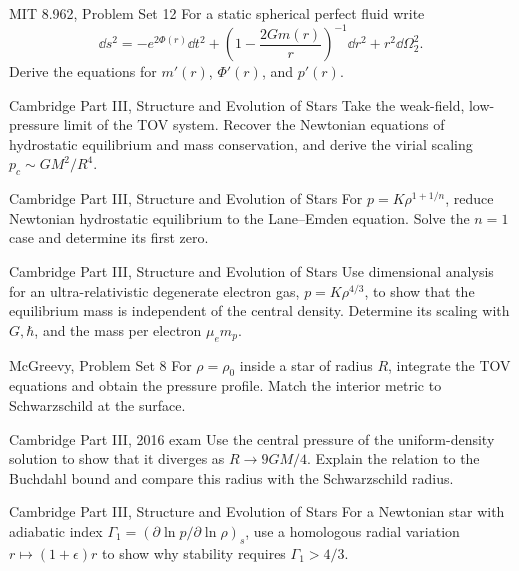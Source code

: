 \begin{exercises}

\begin{exercise}{MIT 8.962, Problem Set 12}
For a static spherical perfect fluid write
\[
\dd s^2=-e^{2\Phi(r)}\dd t^2+
\left(1-\frac{2Gm(r)}r\right)^{-1}\dd r^2+r^2\dd\Omega_2^2.
\]
Derive the equations for \(m'(r)\), \(\Phi'(r)\), and \(p'(r)\).
\end{exercise}

\begin{exercise}{Cambridge Part III, Structure and Evolution of Stars}
Take the weak-field, low-pressure limit of the TOV system.  Recover the
Newtonian equations of hydrostatic equilibrium and mass conservation, and
derive the virial scaling \(p_c\sim GM^2/R^4\).
\end{exercise}

\begin{exercise}{Cambridge Part III, Structure and Evolution of Stars}
For \(p=K\rho^{1+1/n}\), reduce Newtonian hydrostatic equilibrium to the
Lane--Emden equation.  Solve the \(n=1\) case and determine its first zero.
\end{exercise}

\begin{exercise}{Cambridge Part III, Structure and Evolution of Stars}
Use dimensional analysis for an ultra-relativistic degenerate electron gas,
\(p=K\rho^{4/3}\), to show that the equilibrium mass is independent of the
central density.  Determine its scaling with \(G,\hbar\), and the mass per
electron \(\mu_em_p\).
\end{exercise}

\begin{exercise}{McGreevy, Problem Set 8}
For \(\rho=\rho_0\) inside a star of radius \(R\), integrate the TOV equations
and obtain the pressure profile.  Match the interior metric to Schwarzschild
at the surface.
\end{exercise}

\begin{exercise}{Cambridge Part III, 2016 exam}
Use the central pressure of the uniform-density solution to show that it
diverges as \(R\to9GM/4\).  Explain the relation to the Buchdahl bound and
compare this radius with the Schwarzschild radius.
\end{exercise}

\begin{exercise}{Cambridge Part III, Structure and Evolution of Stars}
For a Newtonian star with adiabatic index
\(\Gamma_1=(\partial\ln p/\partial\ln\rho)_s\), use a homologous radial
variation \(r\mapsto(1+\epsilon)r\) to show why stability requires
\(\Gamma_1>4/3\).
\end{exercise}


\end{exercises}
